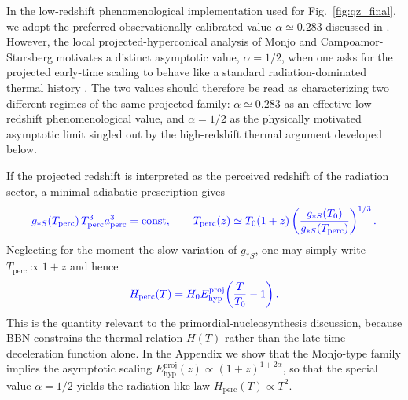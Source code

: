 \documentclass[11pt]{article}
\newcommand{\blue}[1]{{\color{blue}#1}}
\begin{document}
\blue{In the low-redshift phenomenological implementation used for Fig.~\ref{fig:qz_final}, we adopt the preferred observationally calibrated value $\alpha\simeq0.283$ discussed in \cite{monjo2018projected}. However, the local projected-hyperconical analysis of Monjo and Campoamor-Stursberg motivates a distinct asymptotic value, $\alpha=1/2$, when one asks for the projected early-time scaling to behave like a standard radiation-dominated thermal history \cite{monjo2020lagrangian, monjo2023hubble}. The two values should therefore be read as characterizing two different regimes of the same projected family: $\alpha\simeq0.283$ as an effective low-redshift phenomenological value, and $\alpha=1/2$ as the physically motivated asymptotic limit singled out by the high-redshift thermal argument developed below.}

\blue{If the projected redshift is interpreted as the perceived redshift of the radiation sector, a minimal adiabatic prescription gives}
\begin{equation}
\blue{
g_{*S}(T_{\mathrm{perc}})\,T_{\mathrm{perc}}^3 a_{\mathrm{perc}}^3=
\mathrm{const},
\qquad
T_{\mathrm{perc}}(z)\simeq T_0(1+z)
\left(\frac{g_{*S}(T_0)}{g_{*S}(T_{\mathrm{perc}})}\right)^{1/3}.
}
\end{equation}
\blue{Neglecting for the moment the slow variation of $g_{*S}$, one may simply write $T_{\mathrm{perc}}\propto 1+z$ and hence}
\begin{equation}
\blue{
H_{\mathrm{perc}}(T)=H_0 E_{\mathrm{hyp}}^{\mathrm{proj}}\!\left(\frac{T}{T_0}-1\right).
}
\end{equation}
\blue{This is the quantity relevant to the primordial-nucleosynthesis discussion, because BBN constrains the thermal relation $H(T)$ rather than the late-time deceleration function alone. In the Appendix we show that the Monjo-type family implies the asymptotic scaling $E_{\mathrm{hyp}}^{\mathrm{proj}}(z)\propto (1+z)^{1+2\alpha}$, so that the special value $\alpha=1/2$ yields the radiation-like law $H_{\mathrm{perc}}(T)\propto T^2$.}
\end{document}
